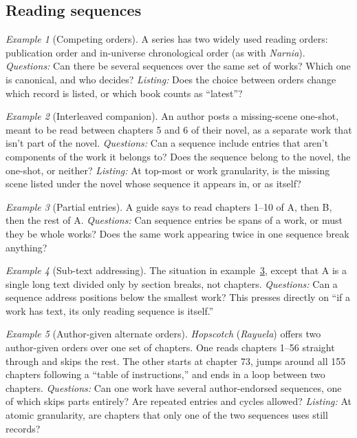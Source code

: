 \documentclass{amsart}
\theoremstyle{remark}
\newtheorem{eg}{Example}
\begin{document}
    \subsection*{Reading sequences}
    \begin{eg}[Competing orders]\label{eg:narnia}
        A series has two widely used reading orders: publication order and in-universe chronological order (as with \textit{Narnia}).
        \emph{Questions:} Can there be several sequences over the same set of works? Which one is canonical, and who decides?
        \emph{Listing:} Does the choice between orders change which record is listed, or which book counts as ``latest''?
    \end{eg}
    \begin{eg}[Interleaved companion]\label{eg:interleaved}
        An author posts a missing-scene one-shot, meant to be read between chapters 5 and 6 of their novel, as a separate work that isn't part of the novel.
        \emph{Questions:} Can a sequence include entries that aren't components of the work it belongs to? Does the sequence belong to the novel, the one-shot, or neither?
        \emph{Listing:} At top-most or work granularity, is the missing scene listed under the novel whose sequence it appears in, or as itself?
    \end{eg}
    \begin{eg}[Partial entries]\label{eg:partial-entries}
        A guide says to read chapters 1--10 of A, then B, then the rest of A.
        \emph{Questions:} Can sequence entries be spans of a work, or must they be whole works? Does the same work appearing twice in one sequence break anything?
    \end{eg}
    \begin{eg}[Sub-text addressing]\label{eg:subtext}
        The situation in example~\ref{eg:partial-entries}, except that A is a single long text divided only by section breaks, not chapters.
        \emph{Questions:} Can a sequence address positions below the smallest work? This presses directly on ``if a work has text, its only reading sequence is itself.''
    \end{eg}
    \begin{eg}[Author-given alternate orders]\label{eg:hopscotch}
        \textit{Hopscotch} (\textit{Rayuela}) offers two author-given orders over one set of chapters. One reads chapters 1--56 straight through and skips the rest. The other starts at chapter 73, jumps around all 155 chapters following a ``table of instructions,'' and ends in a loop between two chapters.
        \emph{Questions:} Can one work have several author-endorsed sequences, one of which skips parts entirely? Are repeated entries and cycles allowed?
        \emph{Listing:} At atomic granularity, are chapters that only one of the two sequences uses still records?
    \end{eg}
\end{document}
